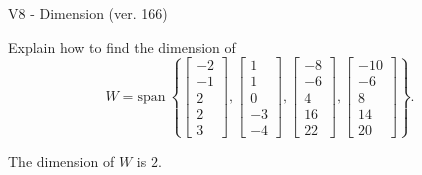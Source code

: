 \begin{exercise}
  \begin{exerciseTitle}V8 - Dimension (ver. 166)\end{exerciseTitle}
  \begin{exerciseStatement}
    Explain how to find the dimension of 
\[W=\mathrm{span}\ \left\{\left[\begin{array}{r}
-2 \\
-1 \\
2 \\
2 \\
3
\end{array}\right] , \left[\begin{array}{r}
1 \\
1 \\
0 \\
-3 \\
-4
\end{array}\right] , \left[\begin{array}{r}
-8 \\
-6 \\
4 \\
16 \\
22
\end{array}\right] , \left[\begin{array}{r}
-10 \\
-6 \\
8 \\
14 \\
20
\end{array}\right]\right\}.\]



  \end{exerciseStatement}
  \begin{exerciseAnswer}
   The dimension of \(W\) is  \(2\).
  


  \end{exerciseAnswer}
\end{exercise}